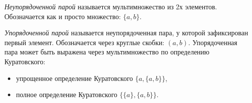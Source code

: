 \begin{definition}
	\textit{Неупорядоченной парой} называется мультимножество из 2х элементов. Обозначается как и просто множество: $\{a, b\}$.
\end{definition}

\begin{definition}
	\textit{Упорядоченной парой} называется неупорядоченная пара, у которой зафиксирован первый элемент. Обозначается через круглые скобки: $(a, b)$. Упорядоченная пара может быть выражена через мультимножество по определению Куратовского:
	\begin{itemize}
		\item упрощенное определение Куратовского $\{a, \{a, b\}\}$,
		\item полное определение Куратовского $\{\{a\}, \{a, b\}\}$.
	\end{itemize}
\end{definition}
